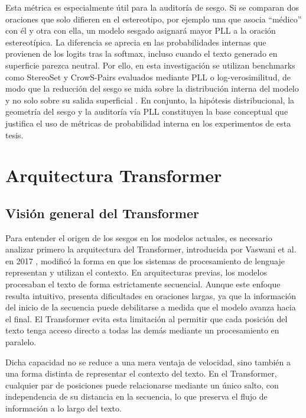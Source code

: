\documentclass[12pt,a4paper]{report}
\begin{document}
Esta métrica es especialmente útil para la auditoría de sesgo. Si se comparan dos oraciones que solo difieren en el estereotipo, por ejemplo una que asocia ``médico'' con él y otra con ella, un modelo sesgado asignará mayor PLL a la oración estereotípica. La diferencia se aprecia en las probabilidades internas que provienen de los logits tras la softmax, incluso cuando el texto generado en superficie parezca neutral. Por ello, en esta investigación se utilizan benchmarks como StereoSet y CrowS-Pairs evaluados mediante PLL o log-verosimilitud, de modo que la reducción del sesgo se mida sobre la distribución interna del modelo y no solo sobre su salida superficial \cite{salazar_masked_2020}. En conjunto, la hipótesis distribucional, la geometría del sesgo y la auditoría vía PLL constituyen la base conceptual que justifica el uso de métricas de probabilidad interna en los experimentos de esta tesis.

\section{Arquitectura Transformer}
\label{sec:arquitectura_transformer}

\subsection{Visión general del Transformer}
\label{subsec:vision_general_transformer}

Para entender el origen de los sesgos en los modelos actuales, es necesario analizar primero la arquitectura del Transformer, introducida por Vaswani et al. en 2017 \cite{vaswani_attention_2017}, modificó la forma en que los sistemas de procesamiento de lenguaje representan y utilizan el contexto. En arquitecturas previas, los modelos procesaban el texto de forma estrictamente secuencial. Aunque este enfoque resulta intuitivo, presenta dificultades en oraciones largas, ya que la información del inicio de la secuencia puede debilitarse a medida que el modelo avanza hacia el final. El Transformer evita esta limitación al permitir que cada posición del texto tenga acceso directo a todas las demás mediante un procesamiento en paralelo.

Dicha capacidad no se reduce a una mera ventaja de velocidad, sino también a una forma distinta de representar el contexto del texto. En el Transformer, cualquier par de posiciones puede relacionarse mediante un único salto, con independencia de su distancia en la secuencia, lo que preserva el flujo de información a lo largo del texto.
\end{document}
